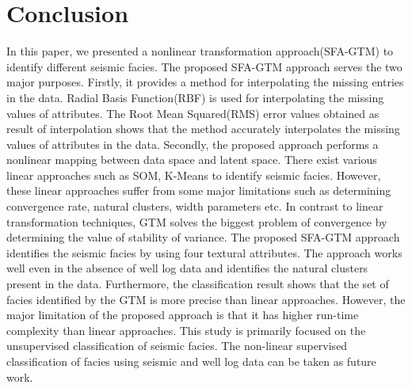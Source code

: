 \documentclass[a4paper]{article}
\begin{document}
\section{Conclusion} 
In this paper, we presented a nonlinear transformation approach(SFA-GTM) to identify different seismic facies. The proposed SFA-GTM approach serves the two major purposes. Firstly, it provides a method for interpolating the missing entries in the data. Radial Basis Function(RBF) is used for interpolating the missing values of attributes. The Root Mean Squared(RMS) error values obtained as result of interpolation shows that the method accurately interpolates the missing values of attributes in the data. Secondly, the proposed approach performs a nonlinear mapping between data space and latent space. There exist various linear approaches such as SOM, K-Means to identify seismic facies. However, these linear approaches suffer from some major limitations such as determining convergence rate, natural clusters, width parameters etc. In contrast to linear transformation techniques, GTM solves the biggest problem of convergence by determining the value of stability of variance. The proposed SFA-GTM approach identifies the seismic facies by using four textural attributes. The approach works well even in the absence of well log data and identifies the natural clusters present in the data. Furthermore, the classification result shows that the set of facies identified by the GTM is more precise than linear approaches. However, the major limitation of the proposed approach is that it has higher run-time complexity than linear approaches. This study is primarily focused on the unsupervised classification of seismic facies. The non-linear supervised classification of facies using seismic and well log data can be taken as future work.
\end{document}
